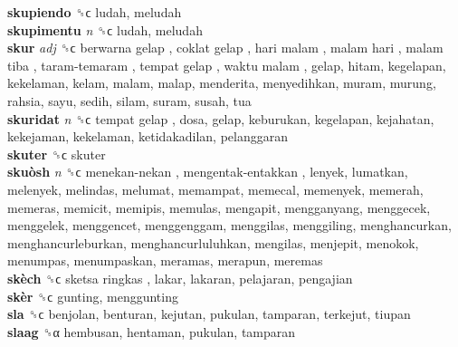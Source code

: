 \textbf{skupiendo} ␝ϲ  ludah, meludah  \\
\textbf{skupimentu} \emph{n}  ␝ϲ  ludah, meludah  \\
\textbf{skur} \emph{adj}  ␝ϲ   berwarna gelap ,  coklat gelap ,  hari malam ,  malam hari ,  malam tiba ,  taram-temaram ,  tempat gelap ,  waktu malam , gelap, hitam, kegelapan, kekelaman, kelam, malam, malap, menderita, menyedihkan, muram, murung, rahsia, sayu, sedih, silam, suram, susah, tua  \\
\textbf{skuridat} \emph{n}  ␝ϲ   tempat gelap , dosa, gelap, keburukan, kegelapan, kejahatan, kekejaman, kekelaman, ketidakadilan, pelanggaran  \\
\textbf{skuter} ␝ϲ  skuter  \\
\textbf{skuòsh} \emph{n}  ␝ϲ   menekan-nekan ,  mengentak-entakkan , lenyek, lumatkan, melenyek, melindas, melumat, memampat, memecal, memenyek, memerah, memeras, memicit, memipis, memulas, mengapit, mengganyang, menggecek, menggelek, menggencet, menggenggam, menggilas, menggiling, menghancurkan, menghancurleburkan, menghancurluluhkan, mengilas, menjepit, menokok, menumpas, menumpaskan, meramas, merapun, meremas  \\
\textbf{skèch} ␝ϲ   sketsa ringkas , lakar, lakaran, pelajaran, pengajian  \\
\textbf{skèr} ␝ϲ  gunting, menggunting  \\
\textbf{sla} ␝ϲ  benjolan, benturan, kejutan, pukulan, tamparan, terkejut, tiupan  \\
\textbf{slaag} ␝α  hembusan, hentaman, pukulan, tamparan  \\
